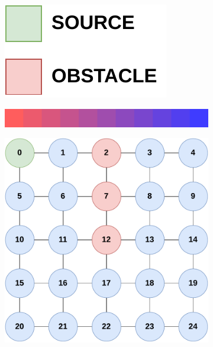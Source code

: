 \begin{figure}[ht!]
    \centering
    \begin{subfigure}[b]{.15\textwidth}
        \centering
        \includegraphics[width=\textwidth]{figures/gradient-environment-legend.pdf}
        \label{fig:gradient-legend}
    \end{subfigure}
    \hfill
    \begin{subfigure}[b]{.49\textwidth}
        \centering
        \includegraphics[width=\textwidth]{figures/palette-cropped2.png}
        \label{fig:gradient-palette}
    \end{subfigure}
    \hfill
    \begin{subfigure}[b]{.49\textwidth}
        \centering
        \includegraphics[width=\textwidth]{figures/gradient-environment.pdf}

\end{subfigure}
\end{figure}
